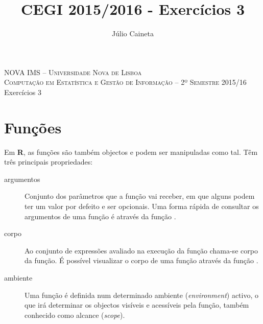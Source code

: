 \documentclass{exam}
\author{Júlio Caineta}
\title{CEGI 2015/2016 - Exercícios 3}
\begin{document}
 
\begin{center}
\textsc {\small NOVA IMS -- Universidade Nova de Lisboa} \\
\textsc {Computação em Estatística e Gestão de Informação -- 2º Semestre 2015/16}
\vspace{5mm} \\
{\large Exercícios 3}
\end{center}
 
\vspace{5mm}

\section*{Funções}

Em \textbf{R}, as funções são também objectos e podem ser manipuladas como tal. Têm três principais propriedades:

\begin{description}
	\item[argumentos] Conjunto dos parâmetros que a função vai receber, em que alguns podem ter um valor por defeito e ser opcionais. Uma forma rápida de consultar os argumentos de uma função é através da função .
	\item[corpo]  Ao conjunto de expressões avaliado na execução da função chama-se corpo da função. É possível visualizar o corpo de uma função através da função .
	\item[ambiente] Uma função é definida num determinado ambiente (\textit{environment}) activo, o que irá determinar os objectos visíveis e acessíveis pela função, também conhecido como alcance (\textit{scope}).
\end{description}
 
\end{document}
